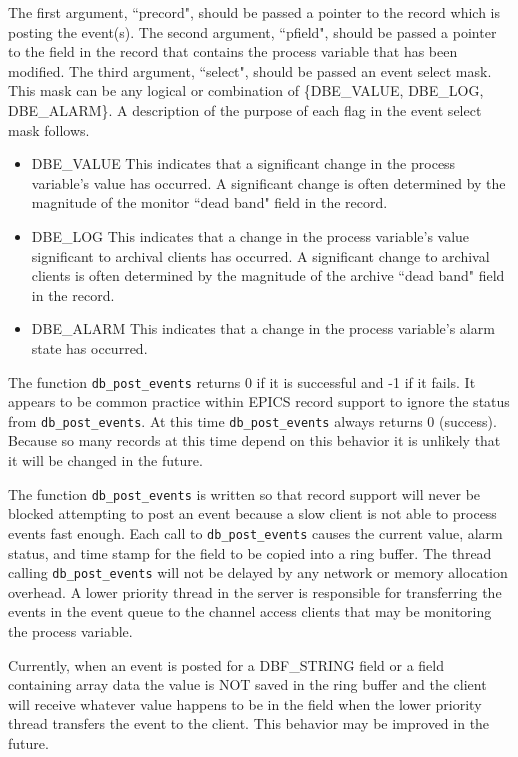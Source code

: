 The first argument, ``precord", should be passed a pointer to the record which is posting the event(s).
The second argument, ``pfield", should be passed a pointer to the field in the record that contains the process variable that has been modified.
The third argument, ``select", should be passed an event select mask.
This mask can be any logical or combination of \{DBE\_VALUE, DBE\_LOG, DBE\_ALARM\}.
A description of the purpose of each flag in the event select mask follows.

\begin{itemize}
\item DBE\_VALUE This indicates that a significant change in the process variable's value has occurred.
A significant change is often determined by the magnitude of the monitor ``dead band" field in the record.

\item DBE\_LOG This indicates that a change in the process variable's value significant to archival clients has occurred.
A significant change to archival clients is often determined by the magnitude of the archive ``dead band" field in the record.

\item DBE\_ALARM This indicates that a change in the process variable's alarm state has occurred.

\end{itemize}

The function \verb|db_post_events| returns 0 if it is successful and -1 if it fails.
It appears to be common practice within EPICS record support to ignore the status from \verb|db_post_events|.
At this time \verb|db_post_events| always returns 0 (success).
Because so many records at this time depend on this behavior it is unlikely that it will be changed in the future.

The function \verb|db_post_events| is written so that record support will never be blocked attempting to post an event because a slow client is not able to process events fast enough.
Each call to \verb|db_post_events| causes the current value, alarm status, and time stamp for the field to be copied into a ring buffer.
The thread calling \verb|db_post_events| will not be delayed by any network or memory allocation overhead.
A lower priority thread in the server is responsible for transferring the events in the event queue to the channel access clients that may be monitoring the process variable.

Currently, when an event is posted for a DBF\_STRING field or a field containing array data the value is NOT saved in the ring buffer and the client will receive whatever value happens to be in the field when the lower priority thread transfers 
the event to the client.
This behavior may be improved in the future.

